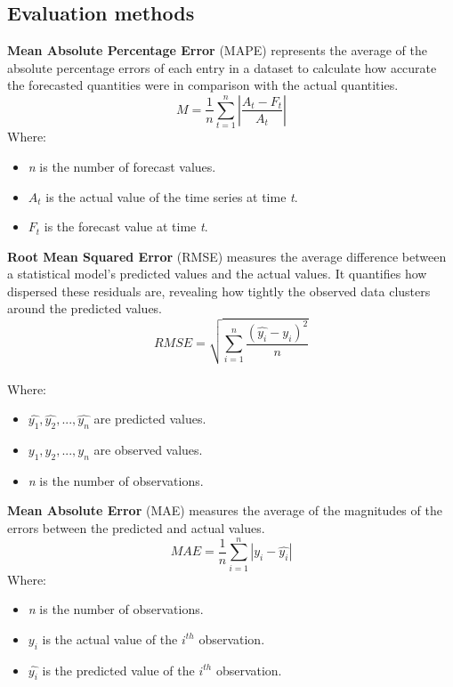 \documentclass{ieeeojies}
\begin{document}
\subsection{Evaluation methods}
\textbf{Mean Absolute Percentage  Error} (MAPE) represents the average of the absolute percentage errors of each entry in a dataset to calculate how accurate the forecasted quantities were in comparison with the actual quantities.\\
\[ M = \frac{1}{n} \sum_{t=1}^{n} \left| \frac{A_{t} - F_{t}}{A_{t}} \right| \]
\newline Where:
\begin{itemize}
	\item \textit{n} is the number of forecast values.
	\item $A_{t}$ is the actual value of the time series at time \textit{t}.
	\item $F_{t}$ is the forecast value at time \textit{t}.
\end{itemize}
\textbf{Root Mean Squared Error} (RMSE) measures the average difference between a statistical model’s predicted values and the actual values. It quantifies how dispersed these residuals are, revealing how tightly the observed data clusters around the predicted values.\\
\[RMSE=\sqrt{\sum_{i=1}^{n} \frac{(\hat{y_i}-y_i )^2}{n} }\]\\
\newline Where:
\begin{itemize}
	\item $\hat{y_1}, \hat{y_2}, ..., \hat{y_n}$ are predicted values.
	\item ${y_1}, {y_2}, ..., {y_n}$ are observed values.
	\item \textit{n} is the number of observations.
\end{itemize}
\textbf{Mean Absolute Error} (MAE) measures the average of the magnitudes of the errors between the predicted and actual values.\\
\[MAE=\frac{1}{n}\sum_{i=1}^{n}|y_i - 
\hat{y_i}|\]
\newline Where:
\begin{itemize}
	\item \textit{n} is the number of observations.
	\item $y_i$ is the actual value of the $i^{th}$ observation.
	\item $\hat{y_i}$ is the predicted value of the $i^{th}$ observation.
\end{itemize}
\end{document}
